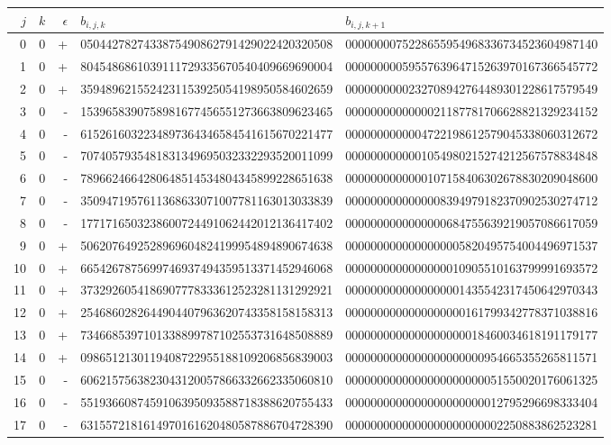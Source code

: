 \begin{longtable}{rrrll}
$j$ & $k$ & $\epsilon$ & $b_{i,j,k}$ & $b_{i,j,k+1}$ \\ \hline\endhead
0 & 0 & + & 0504427827433875490862791429022420320508 & 0000000075228655954968336734523604987140 \\
1 & 0 & + & 8045486861039111729335670540409669690004 & 0000000005955763964715263970167366545772 \\
2 & 0 & + & 3594896215524231153925054198950584602659 & 0000000000232708942764489301228617579549 \\
3 & 0 & - & 1539658390758981677456551273663809623465 & 0000000000000021187781706628821329234152 \\
4 & 0 & - & 6152616032234897364346584541615670221477 & 0000000000004722198612579045338060312672 \\
5 & 0 & - & 7074057935481831349695032332293520011099 & 0000000000001054980215274212567578834848 \\
6 & 0 & - & 7896624664280648514534804345899228651638 & 0000000000000107158406302678830209048600 \\
7 & 0 & - & 3509471957611368633071007781163013033839 & 0000000000000008394979182370902530274712 \\
8 & 0 & - & 1771716503238600724491062442012136417402 & 0000000000000000684755639219057086617059 \\
9 & 0 & + & 5062076492528969604824199954894890674638 & 0000000000000000005820495754004496971537 \\
10 & 0 & + & 6654267875699746937494359513371452946068 & 0000000000000000010905510163799991693572 \\
11 & 0 & + & 3732926054186907778333612523281131292921 & 0000000000000000001435542317450642970343 \\
12 & 0 & + & 2546860282644904407963620743358158158313 & 0000000000000000000161799342778371038816 \\
13 & 0 & + & 7346685397101338899787102553731648508889 & 0000000000000000000018460034618191179177 \\
14 & 0 & + & 0986512130119408722955188109206856839003 & 0000000000000000000000954665355265811571 \\
15 & 0 & - & 6062157563823043120057866332662335060810 & 0000000000000000000000051550020176061325 \\
16 & 0 & - & 5519366087459106395093588718388620755433 & 0000000000000000000000012795296698333404 \\
17 & 0 & - & 6315572181614970161620480587886704728390 & 0000000000000000000000002250883862523281 \\
\end{longtable}
